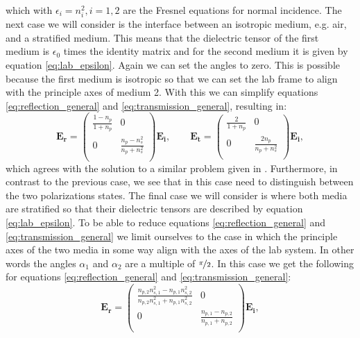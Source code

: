 which with $\epsilon_i=n_i^2, i=1,2$ are the Fresnel equations for normal incidence. The next case we will consider is the interface between an isotropic medium, e.g. air, and a stratified medium. This means that the dielectric tensor of the first medium is $\epsilon_0$ times the identity matrix and for the second medium it is given by equation \ref{eq:lab_epsilon}. Again we can set the angles to zero. This is possible because the first medium is isotropic so that we can set the lab frame to align with the principle axes of medium 2. With this we can simplify equations \ref{eq:reflection_general} and \ref{eq:transmission_general}, resulting in:
\begin{equation}
    \bm{E_r} =
    \begin{pmatrix}
        \frac{1-n_p}{1+n_p} & 0 \\
        0 & \frac{n_p-n_s^2}{n_p+n_s^2} \\
    \end{pmatrix}
    \bm{E_i}, \qquad
    \bm{E_t} =
    \begin{pmatrix}
        \frac{2}{1+n_p} & 0 \\
        0 & \frac{2n_p}{n_p+n_s^2} \\
    \end{pmatrix}
    \bm{E_i},
\end{equation}
which agrees with the solution to a similar problem given in \cite{Lim1993ProblemsElectromagnetism}. Furthermore, in contrast to the previous case, we see that in this case need to distinguish between the two polarizations states. The final case we will consider is where both media are stratified so that their dielectric tensors are described by equation \ref{eq:lab_epsilon}. To be able to reduce equations \ref{eq:reflection_general} and \ref{eq:transmission_general} we limit ourselves to the case in which the principle axes of the two media in some way align with the axes of the lab system. In other words the angles $\alpha_1$ and $\alpha_2$ are a multiple of $\nicefrac{\pi}{2}$. In this case we get the following for equations \ref{eq:reflection_general} and \ref{eq:transmission_general}:
\begin{equation}
    \bm{E_r} =
    \begin{pmatrix}
        \frac{n_{p,2}n_{s,1}^2-n_{p,1}n_{s,2}^2}{n_{p,2}n_{s,1}^2+n_{p,1}n_{s,2}^2} & 0 \\
        0 & \frac{n_{p,1}-n_{p,2}}{n_{p,1}+n_{p,2}} \\
    \end{pmatrix}
    \bm{E_i},
\end{equation}

